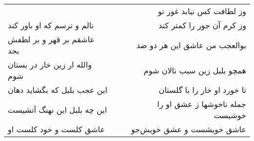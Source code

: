 \begin{center}
\begin{longtable}{l p{0.5cm} r}
&&
وز لطافت کس نیابد غور تو
\\
نالم و ترسم که او باور کند
&&
وز کرم آن جور را کمتر کند
\\
عاشقم بر قهر و بر لطفش بجد
&&
بوالعجب من عاشق این هر دو ضد
\\
والله ار زین خار در بستان شوم
&&
همچو بلبل زین سبب نالان شوم
\\
این عجب بلبل که بگشاید دهان
&&
تا خورد او خار را با گلستان
\\
این چه بلبل این نهنگ آتشیست
&&
جمله ناخوشها ز عشق او را خوشیست
\\
عاشق کلست و خود کلست او
&&
عاشق خویشست و عشق خویش‌جو
\\
\end{longtable}
\end{center}

